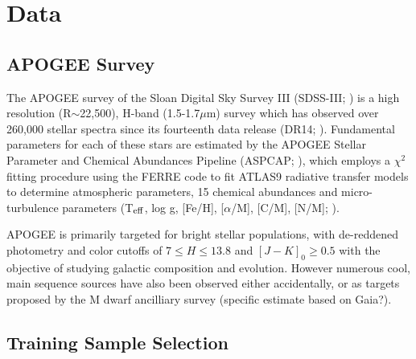 \documentclass[modern]{aastex62}
\begin{document}


\section{Data} \label{sec:data}

\subsection{APOGEE Survey}


The APOGEE survey \citep{Majewski:2015} of the Sloan Digital Sky Survey III (SDSS-III; \citealt{Eisenstein:2011}) is a high resolution (R$\sim$22,500), H-band (1.5-1.7$\mu$m) survey which has observed over 260,000 stellar spectra since its fourteenth data release (DR14; \citealt{Abolfathi:2017}). Fundamental parameters for each of these stars are estimated by the APOGEE Stellar Parameter and Chemical Abundances Pipeline (ASPCAP; \citealt{Perez:2016}), which employs a $\chi^2$ fitting procedure using the FERRE code to fit ATLAS9 radiative transfer models \citep{Castelli:2004} to determine atmospheric parameters, 15 chemical abundances and micro-turbulence parameters (T$_{\rm eff}$, log g, [Fe/H], [$\alpha$/M], [C/M], [N/M]; \citealt{Meszaros:2012}). 

APOGEE is primarily targeted for bright stellar populations, with de-reddened photometry and color cutoffs of $7 \leq H \leq 13.8$ and $[J-K]_0 \geq 0.5$ \citep{Zasowski:2013} with the objective of studying galactic composition and evolution. However numerous cool, main sequence sources have also been observed either accidentally, or as targets proposed by the M dwarf ancilliary survey \citep{Desphande:2013} (specific estimate based on Gaia?).


\subsection{Training Sample Selection}
\end{document}
